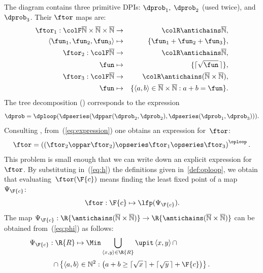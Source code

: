 \noindent The diagram contains three primitive DPIs: $\dprob_{1},$
$\dprob_{2}$ (used twice), and $\dprob_{3}$. Their $\ftor$ maps
are:
\begin{eqnarray*}
\ftor_{1}:{\colF\overline{\mathbb{N}}\times\overline{\mathbb{N}}\times\overline{\mathbb{N}}} & \rightarrow & {\colR\antichains\overline{\mathbb{N}}},\\
\left\langle \fun_{1},\fun_{2},\fun_{3}\right\rangle  & \mapsto & \{\fun_{1}+\fun_{2}+\fun_{3}\},\\
\ftor_{2}:{\colF\overline{\mathbb{N}}} & \rightarrow & {\colR\antichains\overline{\mathbb{N}}},\\
\fun & \mapsto & \{\lceil\sqrt{\fun}\,\rceil\},\\
\ftor_{3}:{\colF\overline{\mathbb{N}}} & \rightarrow & {\colR\antichains(\overline{\mathbb{N}}\times\overline{\mathbb{N}})},\\
\fun & \mapsto & \{\left\langle a,b\right\rangle \in\overline{\mathbb{N}}\times\overline{\mathbb{N}}:a+b=\fun\}.
\end{eqnarray*}
The tree decomposition () corresponds to
the expression
\begin{equation}
\dprob=\dploop(\dpseries(\dppar(\dprob_{2},\dprob_{2}),\dpseries(\dprob_{1},\dprob_{3}))).\label{eq:expression}
\end{equation}
Consulting , from~(\ref{eq:expression})
one obtains an expression for~$\ftor$:
\begin{equation}
\ftor=\left((\ftor_{2}\oppar\ftor_{2})\opseries\ftor_{1}\opseries\ftor_{3}\right)^{\oploop}.\label{eq:h}
\end{equation}
This problem is small enough that we can write down an explicit expression
for~$\ftor$. By substituting in~(\ref{eq:h}) the definitions given
in~\textendash \ref{def:oploop}, we obtain that
evaluating~$\ftor(\F{c})$ means finding the least fixed point of
a map~$\Psi_{\F{c}}$: 
\[
\ftor:\F{c}\mapsto\lfp(\Psi_{\F{c}}).
\]
The map $\Psi_{\F{c}}:\R{\antichains(\overline{\mathbb{N}}\times\overline{\mathbb{N}})}\rightarrow\R{\antichains(\overline{\mathbb{N}}\times\overline{\mathbb{N}})}$
can be obtained from~(\ref{eq:phi}) as follows:
\[
\Psi_{\F{c}}:\R{R}\mapsto\Min\bigcup_{\left\langle x,y\right\rangle \in\R{R}}\upit\left\langle x,y\right\rangle \cap\qquad\qquad\qquad\qquad
\]
\[
\cap\left\{ \left\langle a,b\right\rangle \in\mathbb{N}^{2}:\left(a+b\geq\lceil\sqrt{x}\,\rceil+\lceil\sqrt{y}\,\rceil+\F{c}\right)\right\} .
\]


